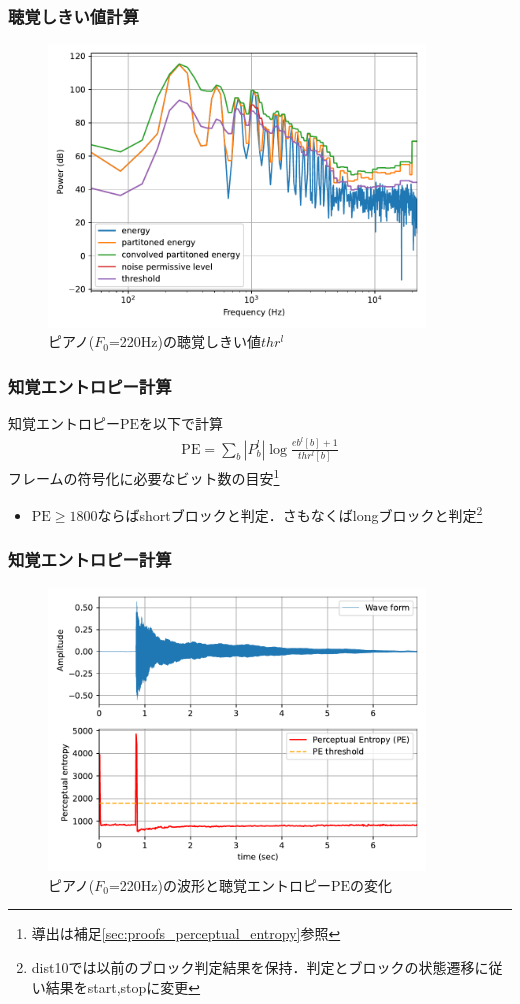 \documentclass[14pt,xcolor=dvipsnames,table,dvipdfmx]{beamer}
\begin{document}
\begin{frame}[c]
    \frametitle{聴覚しきい値計算}
    \begin{figure}
        \includegraphics[width=100mm]{./figs/psyco_analyze_threshold.pdf}
        \caption*{ピアノ($F_{0}$=220Hz)の聴覚しきい値$thr^{l}$}
    \end{figure}
\end{frame}

\begin{frame}[c]
    \frametitle{知覚エントロピー計算}
    知覚エントロピー$\mathrm{PE}$を以下で計算
    \begin{align}
        \mathrm{PE} = \sum_{b} |P^{l}_{b}| \log \frac{eb^{l}[b] + 1}{thr^{l}[b]}
    \end{align}
    フレームの符号化に必要なビット数の目安\footnote{導出は補足\ref{sec:proofs_perceptual_entropy}参照}
    \begin{itemize}
        \item $\mathrm{PE} \geq 1800$ならばshortブロックと判定．さもなくばlongブロックと判定\footnote{dist10では以前のブロック判定結果を保持．判定とブロックの状態遷移に従い結果をstart,stopに変更}
    \end{itemize}
\end{frame}

\begin{frame}[c]
    \frametitle{知覚エントロピー計算}
    \begin{figure}
        \includegraphics[width=100mm]{./figs/perceptual_entropy_computation_example.pdf}
        \caption*{ピアノ($F_{0}$=220Hz)の波形と聴覚エントロピー$\mathrm{PE}$の変化}
    \end{figure}
\end{frame}
\end{document}

